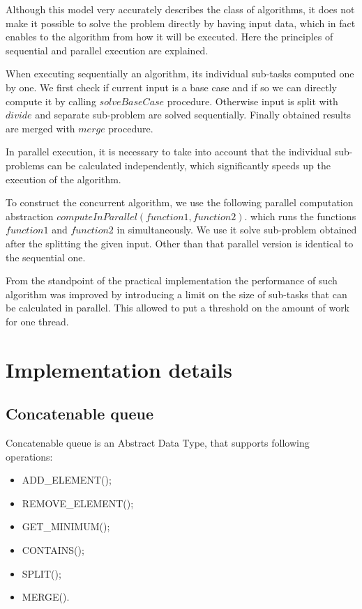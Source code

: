 \documentclass[conference]{IEEEtran}
\theoremstyle{plane}
\begin{document}
		
		Although this model very accurately describes the class of algorithms, it does not make it possible to solve the problem directly by having input data, which in fact enables to the algorithm from how it will be executed. Here the principles of sequential and parallel execution are explained.
		
		When executing sequentially an algorithm, its individual sub-tasks computed one by one. We first check if current input is a base case and if so we can directly compute it by calling $solveBaseCase$ procedure. Otherwise input is split with $divide$ and separate sub-problem are solved sequentially. Finally obtained results are merged with $merge$ procedure.
	
		In parallel execution, it is necessary to take into account that the individual sub-problems can be calculated independently, which significantly speeds up the execution of the algorithm.
		
		To construct the concurrent algorithm, we use the following parallel computation abstraction $computeInParallel(function1, function2)$. which runs the functions $function1$ and $function2$ in simultaneously. We use it solve sub-problem obtained after the splitting the given input. Other than that parallel version is identical to the sequential one.
		
		From the standpoint of the practical implementation the performance of such algorithm was improved by introducing a limit on the size of sub-tasks that can be calculated in parallel. This allowed to put a threshold on the amount of work for one thread.



\section{Implementation details}
\subsection{Concatenable queue}
		
		
		Concatenable queue is an Abstract Data Type, that supports following operations:
		
		\begin{itemize}
			\item
			ADD\_ELEMENT();
			\item
			REMOVE\_ELEMENT();
			\item
			GET\_MINIMUM();
			\item
			CONTAINS();
			\item
			SPLIT();
			\item
			MERGE().
		\end{itemize}
		
\end{document}
